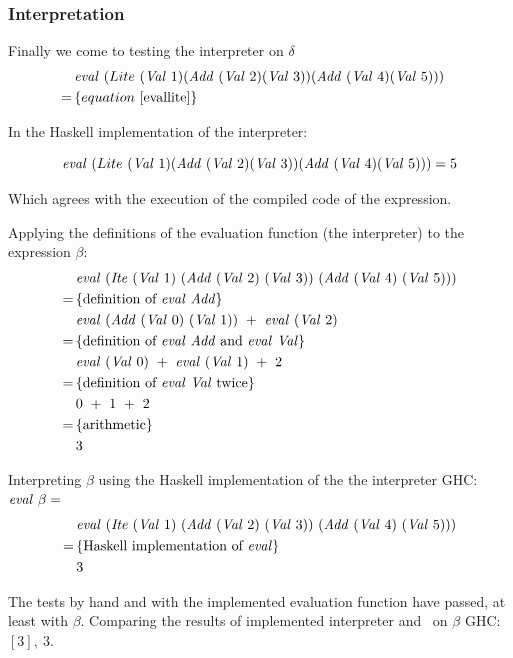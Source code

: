 \documentclass {article}
\begin{document}
\subsubsection{Interpretation}

Finally we come to testing the interpreter on $\delta$
\begin{align*}
&\mathit{eval\ }  (Lite\ (\mathit{Val\ } 1) 
		(\mathit{Add\ } (\mathit{Val\ } 2) (\mathit{Val\ } 3)) 
		(\mathit{Add\ } (\mathit{Val\ } 4) (\mathit{Val\ } 5))) \\
=\, & \{ equation\ \ref{evallite} \}
&
\end{align*}

In the Haskell implementation of the
interpreter:

\[ \mathit{eval\ }  (Lite\ (\mathit{Val\ } 1) (\mathit{Add\ } (\mathit{Val\ } 2) (\mathit{Val\ } 3)) (\mathit{Add\ } (\mathit{Val\ } 4) (\mathit{Val\ } 5)))  = 5\]


Which agrees with the execution of the 
compiled code of the expression.

Applying the definitions of the evaluation function (the interpreter) to the expression $\beta$:
\begin{align*}
	&\evalf  (\Ite (\Val 1)\ 
	(\Add (\Val 2)\ (\Val 3))\ (\Add (\Val 4)\ (\Val 5))) \\
	=\, & \{ \mbox{definition of \eval\ \add} \} \\
	&\evalf  (\Add (\Val 0)\ (\Val 1))\ +\ \evalf  (\Val 2) \\
	=\, & \{ \mbox{definition of \eval\ \add\ and \eval\ \val} \} \\
	&\evalf  (\Val 0)\ +\ \evalf  (\Val 1)\ +\ 2 \\
	=\, & \{ \mbox{definition of \eval\ \val\ twice} \} \\
	&0\ +\ 1\ +\ 2 \\
	=\, & \{ \mbox{arithmetic} \} \\
	&3
\end{align*}

Interpreting $\beta$ 
using the Haskell implementation of the the interpreter
GHC: \( \mathit{eval\ } \beta = \)
\begin{align*}
&\evalf (\Ite (\Val 1)\ 
	(\Add (\Val 2)\ (\Val 3))\ (\Add (\Val 4)\ (\Val 5))) \\
=\, & \{ \mbox{Haskell implementation of \eval} \} \\
&3
\end{align*}

The tests by hand and with the implemented evaluation function
have passed, at least with $\beta$.
Comparing the results of  
implemented interpreter and \vm\ on $\beta$
GHC: \( [3],\ 3 \).
\end{document}
